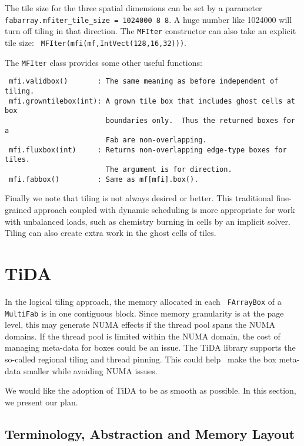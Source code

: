 The tile size for the three spatial dimensions can be set by a parameter
{\tt fabarray.mfiter\_tile\_size = 1024000 8 8}.  A huge number like
1024000 will turn off tiling in that direction.  The {\tt MFIter}
constructor can also take an explicit tile size: {\tt
  MFIter(mfi(mf,IntVect(128,16,32)))}. 

The {\tt MFIter} class provides some other useful functions:
\begin{lstlisting}
 mfi.validbox()       : The same meaning as before independent of tiling.
 mfi.growntilebox(int): A grown tile box that includes ghost cells at box
                        boundaries only.  Thus the returned boxes for a
                        Fab are non-overlapping.
 mfi.fluxbox(int)     : Returns non-overlapping edge-type boxes for tiles.
                        The argument is for direction.
 mfi.fabbox()         : Same as mf[mfi].box().
\end{lstlisting}

Finally we note that tiling is not always desired or better.  This
traditional fine-grained approach coupled with dynamic scheduling is
more appropriate for work with unbalanced loads, such as chemistry
burning in cells by an implicit solver.  Tiling can also create extra
work in the ghost cells of tiles.

\section{TiDA}
\label{sec:tida}

In the logical tiling approach, the memory allocated in each {\tt
  FArrayBox} of a {\tt MultiFab} is in one contiguous block.  Since
memory granularity is at the page level, this may generate NUMA
effects if the thread pool spans the NUMA domains.  If the thread pool
is limited within the NUMA domain, the cost of managing meta-data for
boxes could be an issue.  The TiDA library supports the so-called
regional tiling and thread pinning.  This could help \boxlib\ make the
box meta-data smaller while avoiding NUMA issues.

We would like the adoption of TiDA to be as smooth as possible.  In
this section, we present our plan. 

\subsection{Terminology, Abstraction and Memory Layout}

